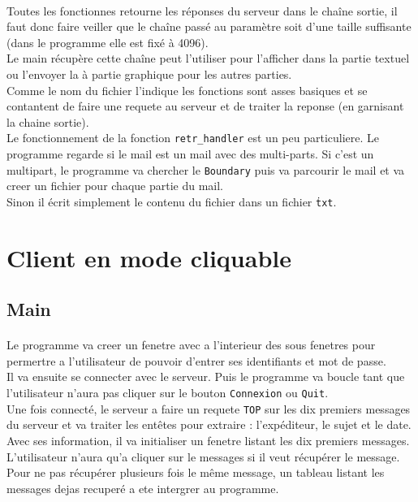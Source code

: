 \documentclass[a4paper, titlepage, oneside, 12pt]{article}%
\begin{document}
\paragraph{}
Toutes les fonctionnes retourne les réponses du serveur dans le chaîne sortie, il faut donc faire veiller que le chaîne passé au paramètre soit d'une taille suffisante (dans le programme elle est fixé à 4096).\\
Le main récupère cette chaîne peut l'utiliser pour l'afficher dans la partie textuel ou l'envoyer la à partie graphique pour les autres parties.\\
Comme le nom du fichier l'indique les fonctions sont asses basiques et se contantent de faire une requete au serveur et de traiter la reponse (en garnisant la chaine sortie).\\
Le fonctionnement de la fonction \texttt{retr\_handler} est un peu particuliere. Le programme regarde si le mail est un mail avec des multi-parts. Si c'est un multipart, le programme va chercher le \texttt{Boundary} puis va parcourir le mail et va creer un fichier pour chaque partie du mail.\\
Sinon il écrit simplement le contenu du fichier dans un fichier \texttt{\.txt}.

\section{Client en mode cliquable}
\subsection{Main}
\paragraph{}
Le programme va creer un fenetre avec a l'interieur des sous fenetres pour permertre a l'utilisateur de pouvoir d'entrer ses identifiants et mot de passe.\\
Il va ensuite se connecter avec le serveur. Puis le programme va boucle tant que l'utilisateur n'aura pas cliquer sur le bouton \texttt{Connexion} ou \texttt{Quit}.\\
Une fois connecté, le serveur a faire un requete \texttt{TOP} sur les dix premiers messages du serveur et va traiter les entêtes pour extraire : l’expéditeur, le sujet et le date. Avec ses information, il va initialiser un fenetre listant les dix premiers messages. L'utilisateur n'aura qu'a cliquer sur le messages si il veut récupérer le message.\\
Pour ne pas récupérer plusieurs fois le même message, un tableau listant les messages dejas recuperé a ete intergrer au programme.
\end{document}
